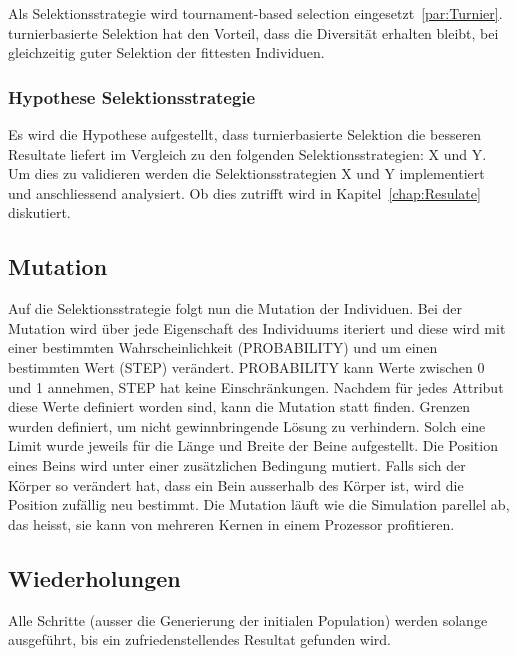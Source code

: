       Als Selektionsstrategie wird tournament-based selection eingesetzt~\ref{par:Turnier}.
      turnierbasierte Selektion hat den Vorteil, dass die Diversität erhalten bleibt,
      bei gleichzeitig guter Selektion der fittesten Individuen.

      \subsubsection{Hypothese Selektionsstrategie\label{sub:Hypothese Selektionsstratgegie}}

        Es wird die Hypothese aufgestellt,
        dass turnierbasierte Selektion die besseren Resultate liefert im Vergleich zu den folgenden Selektionsstrategien: X und Y.
        Um dies zu validieren werden die Selektionsstrategien X und Y implementiert und anschliessend analysiert.
        Ob dies zutrifft wird in Kapitel~\ref{chap:Resulate} diskutiert.

    \subsection{Mutation\label{sec:Mutation}}

      Auf die Selektionsstrategie folgt nun die Mutation der Individuen.
      Bei der Mutation wird über jede Eigenschaft des Individuums iteriert und
      diese wird mit einer bestimmten Wahrscheinlichkeit (PROBABILITY) und um einen bestimmten Wert (STEP) verändert.
      PROBABILITY kann Werte zwischen 0 und 1 annehmen, STEP hat keine Einschränkungen.
      Nachdem für jedes Attribut diese Werte definiert worden sind, kann die Mutation statt finden.
      Grenzen wurden definiert, um nicht gewinnbringende Lösung zu verhindern.
      Solch eine Limit wurde jeweils für die Länge und Breite der Beine aufgestellt.
      Die Position eines Beins wird unter einer zusätzlichen Bedingung mutiert. Falls sich der Körper so verändert hat,
      dass ein Bein ausserhalb des Körper ist, wird die Position zufällig neu bestimmt.
      Die Mutation läuft wie die Simulation parellel ab, das heisst, sie kann von mehreren Kernen in einem Prozessor profitieren.

    \subsection{Wiederholungen}

      Alle Schritte (ausser die Generierung der initialen Population) werden solange ausgeführt,
      bis ein zufriedenstellendes Resultat gefunden wird.

